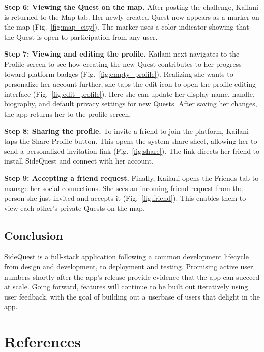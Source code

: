 \documentclass[12pt,a4paper,oneside]{report}
\begin{document}
\textbf{Step 6: Viewing the Quest on the map.}
After posting the challenge, Kailani is returned to the Map tab. Her newly created Quest now appears as a marker on the map (Fig.~\ref{fig:map_city}). The marker uses a color indicator showing that the Quest is open to participation from any user.

\textbf{Step 7: Viewing and editing the profile.}
Kailani next navigates to the Profile screen to see how creating the new Quest contributes to her progress toward platform badges (Fig.~\ref{fig:empty_profile}). Realizing she wants to personalize her account further, she taps the edit icon to open the profile editing interface (Fig.~\ref{fig:edit_profile}). Here she can update her display name, handle, biography, and default privacy settings for new Quests. After saving her changes, the app returns her to the profile screen.

\textbf{Step 8: Sharing the profile.}
To invite a friend to join the platform, Kailani taps the Share Profile button. This opens the system share sheet, allowing her to send a personalized invitation link (Fig.~\ref{fig:share}). The link directs her friend to install SideQuest and connect with her account.

\textbf{Step 9: Accepting a friend request.}
Finally, Kailani opens the Friends tab to manage her social connections. She sees an incoming friend request from the person she just invited and accepts it (Fig.~\ref{fig:friend}). This enables them to view each other’s private Quests on the map.

\section*{Conclusion}
SideQuest is a full-stack application following a common development lifecycle from design and development, to deployment and testing. Promising active user numbers shortly after the app's release provide evidence that the app can succeed at scale. Going forward, features will continue to be built out iteratively using user feedback, with the goal of building out a userbase of users that delight in the app.

\chapter*{References}
\label{references}

\printbibliography[heading=none]
\end{document}
